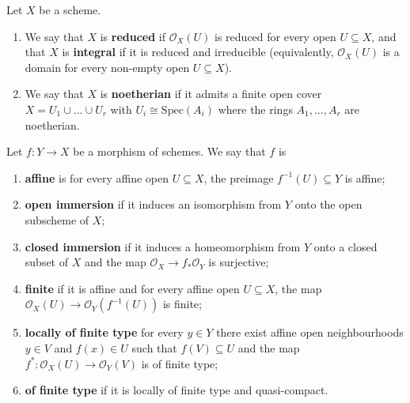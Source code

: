 \documentclass{template}
\begin{document}
\begin{definition}
    Let $X$ be a scheme.
    \begin{enumerate}
        \item[(a)] We say that $X$ is \textbf{reduced} if $\mathcal{O}_X(U)$ is reduced 
        for every open $U \subseteq X$, and that $X$ is \textbf{integral} if it 
        is reduced and irreducible (equivalently, $\mathcal{O}_X(U)$ is a domain 
        for every non-empty open $U \subseteq X$).
        \item[(b)] We say that $X$ is \textbf{noetherian} if it admits a finite open 
        cover $X=U_1 \cup \dots \cup U_r$ with $U_i \cong \text{Spec}(A_i)$ where 
        the rings $A_1,\dots,A_r$ are noetherian.
    \end{enumerate}
\end{definition}

\begin{definition}
    Let $f: Y \to X$ be a morphism of schemes. We say that $f$ is
    \begin{enumerate}
        \item[(a)] \textbf{affine} is for every affine open $U \subseteq X$, the preimage $f^{-1}(U) \subseteq Y$ is affine;
        \item[(b)] \textbf{open immersion} if it induces an isomorphism from $Y$ onto the open subscheme of $X$;
        \item[(c)] \textbf{closed immersion} if it induces a homeomorphism from $Y$ onto a closed subset of $X$ and the map $\mathcal{O}_X \to f_*\mathcal{O}_Y$ is surjective;
        \item[(d)] \textbf{finite} if it is affine and for every affine open $U \subseteq X$, the map $\mathcal{O}_X(U) \to \mathcal{O}_Y(f^{-1}(U))$ is finite;
        \item[(e)] \textbf{locally of finite type} for every $y \in Y$ there exist affine open neighbourhoods $y \in V$ and $f(x) \in U$ such that $f(V) \subseteq U$ and the map $f^*: \mathcal{O}_X(U) \to \mathcal{O}_Y(V)$ is of finite type;
        \item[(f)] \textbf{of finite type} if it is locally of finite type and quasi-compact.    
    \end{enumerate}
\end{definition}
\end{document}
